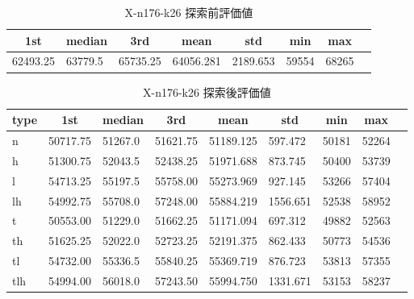 \begin{table}[htbp]
    \caption{X-n176-k26 探索前評価値}
    \begin{tabular}{|l|l|l|l|l|l|l|l|}\hline
    \multicolumn{1}{|c|}{\textbf{1st}}
    &\multicolumn{1}{c|}{\textbf{median}}
    &\multicolumn{1}{c|}{\textbf{3rd}}
    &\multicolumn{1}{c|}{\textbf{mean}}
    &\multicolumn{1}{c|}{\textbf{std}}
    &\multicolumn{1}{c|}{\textbf{min}}
    &\multicolumn{1}{c|}{\textbf{max}}\\\hline
	62493.25 & 63779.5 & 65735.25 & 64056.281 & 2189.653 & 59554 & 68265\\\hline
	\end{tabular}
\end{table}
\begin{table}[htbp]
    \caption{X-n176-k26 探索後評価値}
    \begin{tabular}{|l|l|l|l|l|l|l|l|l|}\hline
    \multicolumn{1}{|c|}{\textbf{type}}
    &\multicolumn{1}{|c|}{\textbf{1st}}
    &\multicolumn{1}{c|}{\textbf{median}}
    &\multicolumn{1}{c|}{\textbf{3rd}}
    &\multicolumn{1}{c|}{\textbf{mean}}
    &\multicolumn{1}{c|}{\textbf{std}}
    &\multicolumn{1}{c|}{\textbf{min}}
    &\multicolumn{1}{c|}{\textbf{max}}\\\hline
	n & 50717.75 & 51267.0 & 51621.75 & 51189.125 & 597.472 & 50181 & 52264\\\hline
	h & 51300.75 & 52043.5 & 52438.25 & 51971.688 & 873.745 & 50400 & 53739\\\hline
	l & 54713.25 & 55197.5 & 55758.00 & 55273.969 & 927.145 & 53266 & 57404\\\hline
	lh & 54992.75 & 55708.0 & 57248.00 & 55884.219 & 1556.651 & 52538 & 58952\\\hline
	t & 50553.00 & 51229.0 & 51662.25 & 51171.094 & 697.312 & 49882 & 52563\\\hline
	th & 51625.25 & 52022.0 & 52723.25 & 52191.375 & 862.433 & 50773 & 54536\\\hline
	tl & 54732.00 & 55336.5 & 55840.25 & 55369.719 & 876.723 & 53813 & 57355\\\hline
	tlh & 54994.00 & 56018.0 & 57243.50 & 55994.750 & 1331.671 & 53153 & 58237\\\hline
	\end{tabular}
\end{table}
